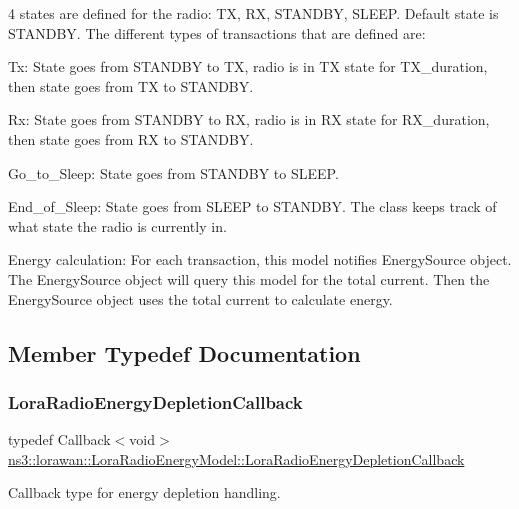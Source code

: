 4 states are defined for the radio\+: TX, RX, S\+T\+A\+N\+D\+BY, S\+L\+E\+EP. Default state is S\+T\+A\+N\+D\+BY. The different types of transactions that are defined are\+:
\begin{DoxyEnumerate}
\item Tx\+: State goes from S\+T\+A\+N\+D\+BY to TX, radio is in TX state for T\+X\+\_\+duration, then state goes from TX to S\+T\+A\+N\+D\+BY.
\item Rx\+: State goes from S\+T\+A\+N\+D\+BY to RX, radio is in RX state for R\+X\+\_\+duration, then state goes from RX to S\+T\+A\+N\+D\+BY.
\item Go\+\_\+to\+\_\+\+Sleep\+: State goes from S\+T\+A\+N\+D\+BY to S\+L\+E\+EP.
\item End\+\_\+of\+\_\+\+Sleep\+: State goes from S\+L\+E\+EP to S\+T\+A\+N\+D\+BY. The class keeps track of what state the radio is currently in.
\end{DoxyEnumerate}

Energy calculation\+: For each transaction, this model notifies Energy\+Source object. The Energy\+Source object will query this model for the total current. Then the Energy\+Source object uses the total current to calculate energy. 

\subsection{Member Typedef Documentation}
\mbox{\label{classns3_1_1lorawan_1_1LoraRadioEnergyModel_a14be2fabbb8f8bab0e0c3c909f1f5662}} 
\subsubsection{\texorpdfstring{Lora\+Radio\+Energy\+Depletion\+Callback}{LoraRadioEnergyDepletionCallback}}
{\footnotesize\ttfamily typedef Callback$<$void$>$ \hyperlink{classns3_1_1lorawan_1_1LoraRadioEnergyModel_a14be2fabbb8f8bab0e0c3c909f1f5662}{ns3\+::lorawan\+::\+Lora\+Radio\+Energy\+Model\+::\+Lora\+Radio\+Energy\+Depletion\+Callback}}

Callback type for energy depletion handling. \mbox{\label{classns3_1_1lorawan_1_1LoraRadioEnergyModel_aa621913a2b37844d79e4033f85d650dc}} 
